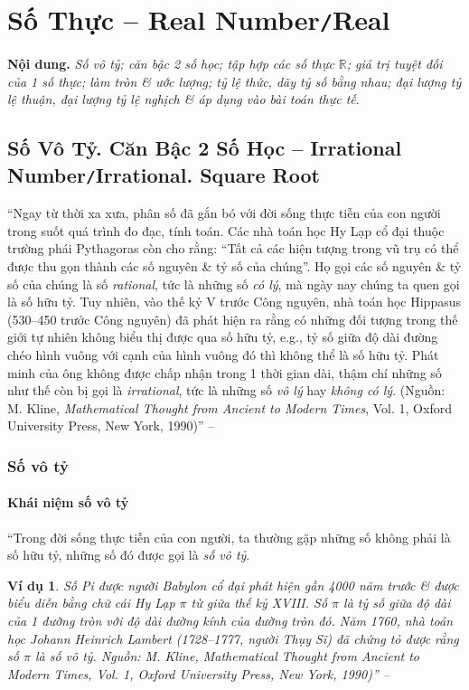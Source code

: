 \documentclass{article}
\numberwithin{equation}{section}
\newtheorem{vidu}{Ví dụ}[section]
\begin{document}
\section{Số Thực -- Real Number\texttt{/}Real}
\textbf{Nội dung.} \textit{Số vô tỷ; căn bậc 2 số học; tập hợp các số thực $\mathbb{R}$; giá trị tuyệt đối của 1 số thực; làm tròn \& ước lượng; tỷ lệ thức, dãy tỷ số bằng nhau; đại lượng tỷ lệ thuận, đại lượng tỷ lệ nghịch \& áp dụng vào bài toán thực tế}.

\subsection{Số Vô Tỷ. Căn Bậc 2 Số Học -- Irrational Number\texttt{/}Irrational. Square Root}
``Ngay từ thời xa xưa, phân số đã gắn bó với đời sống thực tiễn của con người trong suốt quá trình đo đạc, tính toán. Các nhà toán học Hy Lạp cổ đại thuộc trường phái Pythagoras còn cho rằng: ``Tất cả các hiện tượng trong vũ trụ có thể được thu gọn thành các số nguyên \& tỷ số của chúng''. Họ gọi các số nguyên \& tỷ số của chúng là số \textit{rational}, tức là những số \textit{có lý}, mà ngày nay chúng ta quen gọi là số hữu tỷ. Tuy nhiên, vào thế kỷ V trước Công nguyên, nhà toán học Hippasus (530--450 trước Công nguyên) đã phát hiện ra rằng có những đối tượng trong thế giới tự nhiên không biểu thị được qua số hữu tỷ, e.g., tỷ số giữa độ dài đường chéo hình vuông với cạnh của hình vuông đó thì không thể là số hữu tỷ. Phát minh của ông không được chấp nhận trong 1 thời gian dài, thậm chí những số như thế còn bị gọi là \textit{irrational}, tức là những số \textit{vô lý} hay \textit{không có lý}. (Nguồn: M. Kline, \textit{Mathematical Thought from Ancient to Modern Times}, Vol. 1, Oxford University Press, New York, 1990)''  -- \cite[p. 32]{SGK_Toan_7_Canh_Dieu_tap_1}

\subsubsection{Số vô tỷ}

\paragraph{Khái niệm số vô tỷ}
``Trong đời sống thực tiễn của con người, ta thường gặp những số không phải là số hữu tỷ, những số đó được gọi là \textit{số vô tỷ}.

\begin{vidu}
	Số Pi được người Babylon cổ đại phát hiện gần 4000 năm trước \& được biểu diễn bằng chữ cái Hy Lạp $\pi$ từ giữa thế kỷ XVIII. Số $\pi$ là tỷ số giữa độ dài của 1 đường tròn với độ dài đường kính của đường tròn đó. Năm 1760, nhà toán học Johann Heinrich Lambert (1728--1777, người Thụy Sĩ) đã chứng tỏ được rằng số $\pi$ là số vô tỷ. Nguồn: M. Kline, \textit{Mathematical Thought from Ancient to Modern Times}, Vol. 1, Oxford University Press, New York, 1990)'' -- \cite[p. 32]{SGK_Toan_7_Canh_Dieu_tap_1}
\end{vidu}
\end{document}
